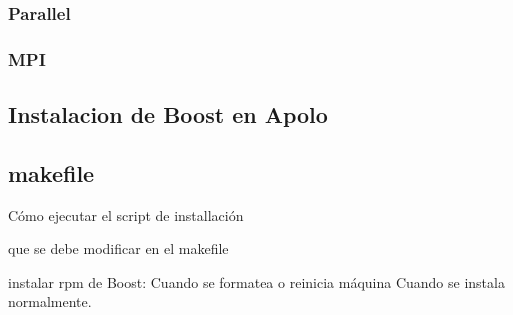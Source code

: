 \subsubsection{Parallel}
\subsubsection{MPI}

\subsection{Instalacion de Boost en Apolo}

\subsection{makefile}

Cómo ejecutar el script de installación 

que se debe modificar en el makefile\cite{Wall2000}

instalar rpm de Boost:
Cuando se formatea o reinicia máquina
Cuando se instala normalmente.
